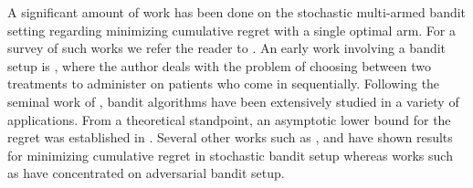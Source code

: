 	A significant amount of work has been done on the stochastic multi-armed bandit setting regarding minimizing cumulative regret with a single optimal arm. For a survey of such works we refer the reader to \cite{bubeck2012regret}. An early work involving a bandit setup is \cite{thompson1933likelihood}, where the author deals with the problem of choosing between two treatments to administer on patients who come in sequentially. Following the seminal work of  \cite{robbins1952some}, bandit algorithms have been extensively studied in a variety of applications. From a theoretical standpoint, an asymptotic lower bound for the regret was established in \cite{lai1985asymptotically}. Several other works such as \cite{auer2002finite},  \cite{audibert2009minimax} and \cite{auer2010ucb} have shown results for minimizing cumulative regret in stochastic bandit setup whereas works such as \cite{auer2002nonstochastic} have concentrated on adversarial bandit setup.
	
	


